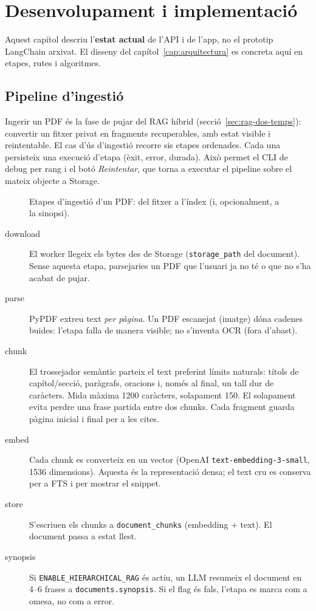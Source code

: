 \chapter{Desenvolupament i implementació}
\label{cap:desarrollo}

Aquest capítol descriu l'\textbf{estat actual} de l'API i de l'app, no el prototip LangChain arxivat. El disseny del capítol~\ref{cap:arquitectura} es concreta aquí en etapes, rutes i algoritmes.

\section{Pipeline d'ingestió}

Ingerir un PDF és la fase de pujar del RAG híbrid (secció~\ref{sec:rag-dos-temps}): convertir un fitxer privat en fragments recuperables, amb estat visible i reintentable. El cas d'ús d'ingestió recorre sis etapes ordenades. Cada una persisteix una execució d'etapa (èxit, error, durada). Això permet el CLI de debug per rang i el botó \emph{Reintentar}, que torna a executar el pipeline sobre el mateix objecte a Storage.

\begin{figure}[htbp]
\centering

\caption{Etapes d'ingestió d'un PDF: del fitxer a l'índex (i, opcionalment, a la sinopsi).}
\label{fig:pipeline}
\end{figure}

\begin{description}
  \item[download] El worker llegeix els bytes des de Storage (\texttt{storage\_path} del document). Sense aquesta etapa, parsejaries un PDF que l'usuari ja no té o que no s'ha acabat de pujar.
  \item[parse] PyPDF extreu text \emph{per pàgina}. Un PDF escanejat (imatge) dóna cadenes buides: l'etapa falla de manera visible; no s'inventa OCR (fora d'abast).
  \item[chunk] El trossejador semàntic parteix el text preferint límits naturals: títols de capítol/secció, paràgrafs, oracions i, només al final, un tall dur de caràcters. Mida màxima 1200 caràcters, solapament 150. El solapament evita perdre una frase partida entre dos chunks. Cada fragment guarda pàgina inicial i final per a les cites.
  \item[embed] Cada chunk es converteix en un vector (OpenAI \texttt{text-embedding-3-small}, 1536 dimensions). Aquesta és la representació densa; el text cru es conserva per a FTS i per mostrar el snippet.
  \item[store] S'escriuen els chunks a \texttt{document\_chunks} (embedding + text). El document passa a estat llest.
  \item[synopsis] Si \texttt{ENABLE\_HIERARCHICAL\_RAG} és actiu, un LLM resumeix el document en 4--6 frases a \texttt{documents.synopsis}. Si el flag és fals, l'etapa es marca com a omesa, no com a error.
\end{description}


